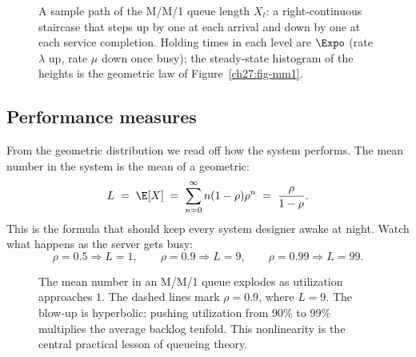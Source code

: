\begin{figure}[H]
\centering
{}
\caption{A sample path of the M/M/1 queue length $X_t$: a right-continuous staircase that steps up by
one at each arrival and down by one at each service completion. Holding times in each level are
$\Expo$ (rate $\lambda$ up, rate $\mu$ down once busy); the steady-state histogram of the heights is
the geometric law of Figure~\ref{ch27:fig-mm1}.}
\label{ch27:fig-samplepath}
\end{figure}

\subsection{Performance measures}

From the geometric distribution we read off how the system performs. The mean number in the system
is the mean of a geometric:
\[
  L \;=\; \E[X] \;=\; \sum_{n=0}^{\infty} n(1-\rho)\rho^n \;=\; \frac{\rho}{1-\rho}.
\]
This is the formula that should keep every system designer awake at night. Watch what happens as the
server gets busy:
\[
  \rho = 0.5 \Rightarrow L = 1, \qquad
  \rho = 0.9 \Rightarrow L = 9, \qquad
  \rho = 0.99 \Rightarrow L = 99.
\]

\begin{figure}[H]
\centering
{}
\caption{The mean number in an M/M/1 queue explodes as utilization approaches $1$. The dashed lines
mark $\rho = 0.9$, where $L = 9$. The blow-up is hyperbolic: pushing utilization from $90\%$ to
$99\%$ multiplies the average backlog tenfold. This nonlinearity is the central practical lesson of
queueing theory.}
\label{ch27:fig-L}
\end{figure}

